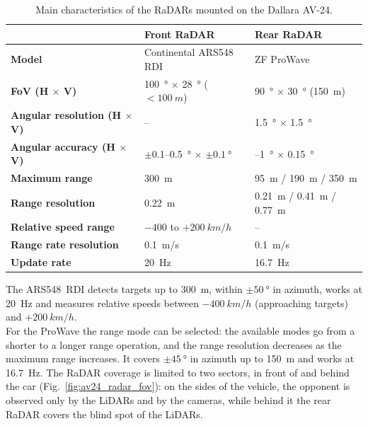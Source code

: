 \begin{table}[H]
    \centering
    \footnotesize
    \setlength{\tabcolsep}{4pt}
    \begin{tabular}{|>{\raggedright\arraybackslash}p{}>{\raggedright\arraybackslash}p{}>{\raggedright\arraybackslash}p{}|}
        \hline
                                          \rowcolor{bluepoli!40} & \textbf{Front RaDAR} & \textbf{Rear RaDAR} \\
        \hline\hline
        \textbf{Model} & Continental ARS548 RDI           & ZF ProWave \\
        \textbf{FoV (H $\times$ V)} & \SI{100}{\degree} $\times$ \SI{28}{\degree} (${<}\SI{100}{m}$) & \SI{90}{\degree} $\times$ \SI{30}{\degree} (\SI{150}{m}) \\
        \textbf{Angular resolution (H $\times$ V)} & --                               & \SI{1.5}{\degree} $\times$ \SI{1.5}{\degree} \\
        \textbf{Angular accuracy (H $\times$ V)} & $\pm$0.1--\SI{0.5}{\degree} $\times$ $\pm\SI{0.1}{\degree}$ & 0.15--\SI{1}{\degree} $\times$ \SI{0.15}{\degree} \\
        \textbf{Maximum range} & \SI{300}{m}                      & \SI{95}{m} / \SI{190}{m} / \SI{350}{m} \\
        \textbf{Range resolution} & \SI{0.22}{m}                     & \SI{0.21}{m} / \SI{0.41}{m} / \SI{0.77}{m} \\
        \textbf{Relative speed range} & $-400$ to $+\SI{200}{km/h}$        & -- \\
        \textbf{Range rate resolution} & \SI{0.1}{m/s}                    & \SI{0.1}{m/s} \\
        \textbf{Update rate} & \SI{20}{Hz}                       & \SI{16.7}{Hz} \\
        \hline
    \end{tabular}
    \caption{Main characteristics of the RaDARs mounted on the Dallara AV-24.}
    \label{tab:radar_av24}
\end{table}

The ARS548~RDI detects targets up to \SI{300}{m}, within $\pm\SI{50}{\degree}$ in azimuth,
works at \SI{20}{Hz} and measures relative speeds between $-\SI{400}{km/h}$ (approaching targets) and
$+\SI{200}{km/h}$. \\For the ProWave the range mode can be selected: the
available modes go from a shorter to a longer range operation, and the range resolution
decreases as the maximum range increases. It covers $\pm\SI{45}{\degree}$ in azimuth up to
\SI{150}{m} and works at \SI{16.7}{Hz}. The RaDAR coverage is limited to two sectors, in
front of and behind the car (Fig.~\ref{fig:av24_radar_fov}): on the sides of the vehicle,
the opponent is observed only by the LiDARs and by the cameras, while behind it the rear
RaDAR covers the blind spot of the LiDARs.

